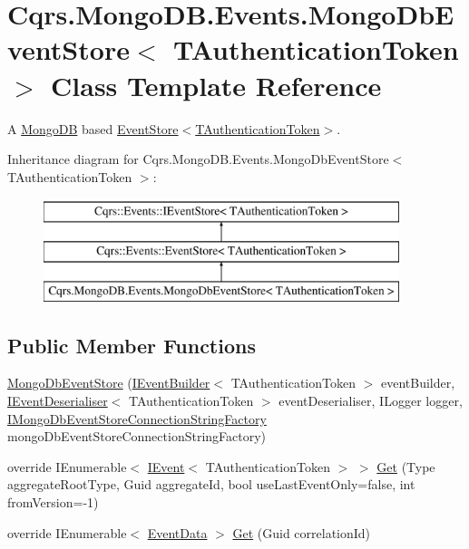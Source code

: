 \hypertarget{classCqrs_1_1MongoDB_1_1Events_1_1MongoDbEventStore}{}\section{Cqrs.\+Mongo\+D\+B.\+Events.\+Mongo\+Db\+Event\+Store$<$ T\+Authentication\+Token $>$ Class Template Reference}
\label{classCqrs_1_1MongoDB_1_1Events_1_1MongoDbEventStore}


A \hyperlink{namespaceCqrs_1_1MongoDB}{Mongo\+DB} based \hyperlink{classCqrs_1_1Events_1_1EventStore_a6346cb2aea4c5b4e740dc6cfb15abab8_a6346cb2aea4c5b4e740dc6cfb15abab8}{Event\+Store$<$\+T\+Authentication\+Token$>$}.  


Inheritance diagram for Cqrs.\+Mongo\+D\+B.\+Events.\+Mongo\+Db\+Event\+Store$<$ T\+Authentication\+Token $>$\+:\begin{figure}[H]
\begin{center}
\leavevmode
\includegraphics[height=3.000000cm]{classCqrs_1_1MongoDB_1_1Events_1_1MongoDbEventStore}
\end{center}
\end{figure}
\subsection*{Public Member Functions}
\begin{DoxyCompactItemize}
\item 
\hyperlink{classCqrs_1_1MongoDB_1_1Events_1_1MongoDbEventStore_aba191a256900183f880d1f083b384b26_aba191a256900183f880d1f083b384b26}{Mongo\+Db\+Event\+Store} (\hyperlink{interfaceCqrs_1_1Events_1_1IEventBuilder}{I\+Event\+Builder}$<$ T\+Authentication\+Token $>$ event\+Builder, \hyperlink{interfaceCqrs_1_1Events_1_1IEventDeserialiser}{I\+Event\+Deserialiser}$<$ T\+Authentication\+Token $>$ event\+Deserialiser, I\+Logger logger, \hyperlink{interfaceCqrs_1_1MongoDB_1_1Events_1_1IMongoDbEventStoreConnectionStringFactory}{I\+Mongo\+Db\+Event\+Store\+Connection\+String\+Factory} mongo\+Db\+Event\+Store\+Connection\+String\+Factory)
\item 
override I\+Enumerable$<$ \hyperlink{interfaceCqrs_1_1Events_1_1IEvent}{I\+Event}$<$ T\+Authentication\+Token $>$ $>$ \hyperlink{classCqrs_1_1MongoDB_1_1Events_1_1MongoDbEventStore_a7a1ac8e59dc5bff0bb6562fb4f43e8df_a7a1ac8e59dc5bff0bb6562fb4f43e8df}{Get} (Type aggregate\+Root\+Type, Guid aggregate\+Id, bool use\+Last\+Event\+Only=false, int from\+Version=-\/1)
\item 
override I\+Enumerable$<$ \hyperlink{classCqrs_1_1Events_1_1EventData}{Event\+Data} $>$ \hyperlink{classCqrs_1_1MongoDB_1_1Events_1_1MongoDbEventStore_ac886ca0a57ad86cb99ef0a3767db9280_ac886ca0a57ad86cb99ef0a3767db9280}{Get} (Guid correlation\+Id)
\end{DoxyCompactItemize}
